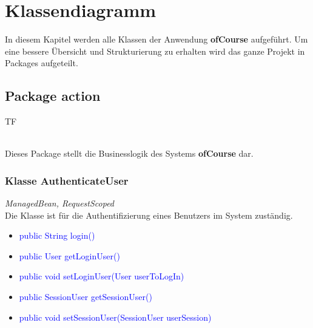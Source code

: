 \chapter{Klassendiagramm}
	\newcommand{\class}[1]{\paragraph{Klasse #1:}\ \\ }
	\newcommand{\interface}[1]{\paragraph{Interface #1:}\ \\ }
	\newcommand{\method}[1]{\textcolor{blue}{#1}}
	\newcommand{\kursiv}[1]{{\it #1}}
	\newcommand{\override}{{\it @Override}\ \\}
	
	In diesem Kapitel werden alle Klassen der Anwendung \textbf{ofCourse} aufgeführt.
	Um eine bessere Übersicht und Strukturierung zu erhalten wird das ganze Projekt in Packages aufgeteilt.
	
	\section{Package action}
	\begin{tiny}
		TF\\
	\end{tiny}\\
	Dieses Package stellt die Businesslogik des Systems \textbf{ofCourse} dar.
	\subsection{Klasse AuthenticateUser}
	\kursiv{ManagedBean, RequestScoped}\\
	Die Klasse ist für die Authentifizierung eines Benutzers im System zuständig.
	\begin{itemize}
		\item \method{public String login()}
		\item \method{public User getLoginUser()}
		\item \method{public void setLoginUser(User userToLogIn)}
		\item \method{public SessionUser getSessionUser()}
		\item \method{public void setSessionUser(SessionUser userSession)}
	\end{itemize}
	
